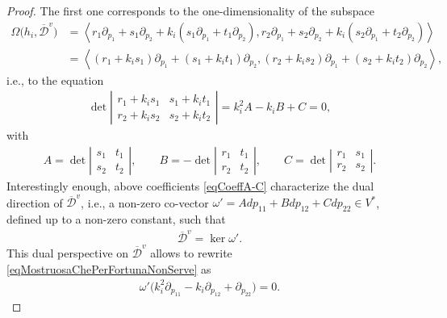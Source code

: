 \documentclass[10pt,a4paper]{amsart}
\newcommand{\D}{\mathcal{D}}
\newcommand{\Span}[1]{\left\langle #1 \right\rangle}
\numberwithin{equation}{section}
\begin{document}
\begin{proof}
The f\/irst one corresponds to the one-dimensionality of the subspace
\begin{align}
 \Omega\big(h_i,\overline{\D}^v\big)&=\Span{r_1\partial_{p_{1}}+s_1 \partial_{p_{2}}+k_i(s_1 \partial_{p_{1}}+t_1 \partial_{p_{2}}),r_2\partial_{p_{1}}+s_2 \partial_{p_{2}}+k_i(s_2 \partial_{p_{1}}+t_2 \partial_{p_{2}})}\nonumber\\
 &=\Span{(r_1+k_is_1)\partial_{p_{1}}+(s_1+k_it_1) \partial_{p_{2}}, (r_2+k_is_2)\partial_{p_{1}}+(s_2+k_it_2) \partial_{p_{2}}},\label{eqOmegaHDiPrimo}
\end{align}
i.e., to the equation
\begin{gather}\label{eqMostruosaChePerFortunaNonServe}
\det \left|\begin{matrix}r_1+k_is_1 & s_1+k_it_1 \\r_2+k_is_2 & s_2+k_it_2\end{matrix}\right| = k_i^2 A -k_i B + C =0,
\end{gather}
with
\begin{gather}\label{eqCoeffA-C}
A= \det\left|\begin{matrix}s_1 & t_1 \\s_2 & t_2\end{matrix}\right|, \qquad %
B= - \det\left|\begin{matrix}r_1 & t_1 \\r_2 & t_2\end{matrix}\right|,\qquad %
C= \det\left|\begin{matrix}r_1 & s_1 \\r_2 & s_2\end{matrix}\right|. %
\end{gather}
Interestingly  enough, above coef\/f\/icients \eqref{eqCoeffA-C} characterize the dual direction of $\overline{\D}^v$, i.e., a non-zero co-vector $\omega'=Adp_{11}+Bdp_{12}+Cdp_{22}\in V^\ast$, def\/ined up to a non-zero constant, such that
\begin{gather}\label{Dvprimodual}
\overline{\D}^v=\ker \omega'.
\end{gather}
This dual perspective on $\overline{\D}^v$ allows to rewrite \eqref{eqMostruosaChePerFortunaNonServe} as
\begin{gather}\label{eqMostruosaChePerFortunaNonServeMigliore}
\omega'\big(k_i^2\partial_{p_{11}}-k_i\partial_{p_{12}}+ \partial_{p_{22}}\big)=0.
\end{gather}

\end{proof}
\end{document}
